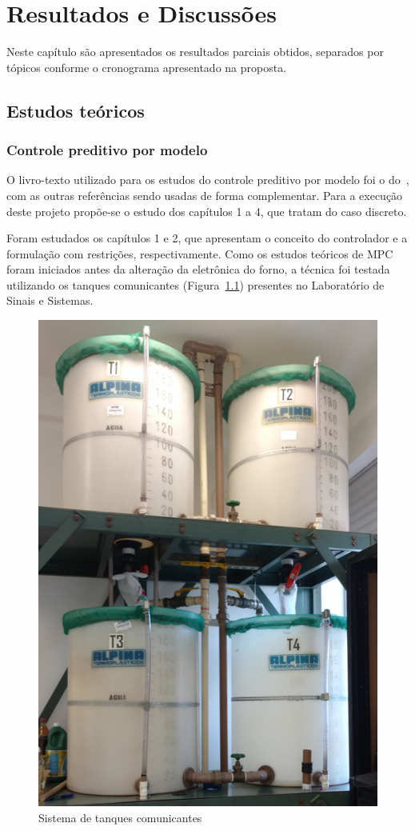 
\chapter{Resultados e Discussões}%
\label{chp:results}

Neste capítulo são apresentados os resultados parciais obtidos, separados por
tópicos conforme o cronograma apresentado na proposta.

\section{Estudos teóricos}%
\label{sec:studies}

\subsection{Controle preditivo por modelo}%
\label{subsec:mpc-studies}

O livro-texto utilizado para os estudos do controle preditivo por modelo foi o
do~\textcite{book:wang}, com as outras referências sendo usadas de forma
complementar. Para a execução deste projeto propõe-se o estudo dos capítulos 1 a
4, que tratam do caso discreto.

Foram estudados os capítulos 1 e 2, que apresentam o conceito do controlador e a
formulação com restrições, respectivamente. Como os estudos teóricos de \ac{MPC}
foram iniciados antes da alteração da eletrônica do forno, a técnica foi testada
utilizando os tanques comunicantes (Figura~\ref{fig:tanks}) presentes no
Laboratório de Sinais e Sistemas.

\begin{figure}[ht!]
    \centering
    \captionsetup{justification=centering}
    \includegraphics[height=0.5\linewidth]{imgs/tanques}
    \caption{Sistema de tanques comunicantes}%
    \label{fig:tanks}
\end{figure}

